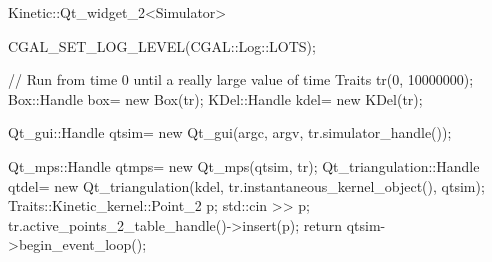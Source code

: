 \begin{ccRefClass}{Kinetic::Qt_widget_2<Simulator>}
\begin{ccExampleCode}
{  CGAL_SET_LOG_LEVEL(CGAL::Log::LOTS);

  // Run from time 0 until a really large value of time
  Traits tr(0, 10000000);
  Box::Handle box= new Box(tr);
  KDel::Handle kdel= new KDel(tr);

  Qt_gui::Handle qtsim= new Qt_gui(argc, argv, tr.simulator_handle());

  Qt_mps::Handle qtmps= new Qt_mps(qtsim, tr);
  Qt_triangulation::Handle qtdel= new Qt_triangulation(kdel, tr.instantaneous_kernel_object(), qtsim);
  Traits::Kinetic_kernel::Point_2 p;
  std::cin >> p;
  tr.active_points_2_table_handle()->insert(p);
  return qtsim->begin_event_loop();
}

\end{ccExampleCode}

\end{ccRefClass}


